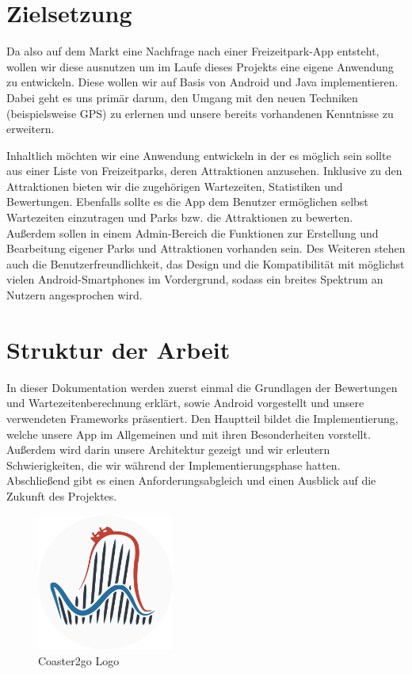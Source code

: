 \section{Zielsetzung}
\label{sec:einleitung:zielsetzung}

Da also auf dem Markt eine Nachfrage nach einer Freizeitpark-App entsteht, wollen wir diese ausnutzen um im Laufe dieses Projekts eine eigene Anwendung zu entwickeln. Diese wollen wir auf Basis von Android und Java implementieren. Dabei geht es uns primär darum, den Umgang mit den neuen Techniken (beispielsweise GPS) zu erlernen und unsere bereits vorhandenen Kenntnisse zu erweitern. 

Inhaltlich möchten wir eine Anwendung entwickeln in der es möglich sein sollte aus einer Liste von Freizeitparks, deren Attraktionen anzusehen. Inklusive zu den Attraktionen bieten wir die zugehörigen Wartezeiten, Statistiken und Bewertungen. 
Ebenfalls sollte es die App dem Benutzer ermöglichen selbst Wartezeiten einzutragen und Parks bzw. die Attraktionen zu bewerten.
Außerdem sollen in einem Admin-Bereich die Funktionen zur Erstellung und Bearbeitung eigener Parks und Attraktionen vorhanden sein.
Des Weiteren stehen auch die Benutzerfreundlichkeit, das Design und die Kompatibilität mit möglichst vielen Android-Smartphones im Vordergrund, sodass ein breites Spektrum an Nutzern angesprochen wird. 

\section{Struktur der Arbeit}
\label{sec:einleitung:struktur}

In dieser Dokumentation werden zuerst einmal die Grundlagen der Bewertungen und Wartezeitenberechnung erklärt, sowie Android vorgestellt und unsere verwendeten Frameworks präsentiert. Den Hauptteil bildet die Implementierung, welche unsere App im Allgemeinen und mit ihren Besonderheiten vorstellt. Außerdem wird darin unsere Architektur gezeigt und wir erleutern Schwierigkeiten, die wir während der Implementierungsphase hatten. Abschließend gibt es einen Anforderungsabgleich und einen Ausblick auf die Zukunft des Projektes.\\

\begin{figure}[htp]
	\centering
  	\includegraphics[width=0.4\textwidth]{img/coaster42_logo.png}
	\caption{Coaster2go Logo}
	\label{figure:coaster2gologo}
\end{figure}
